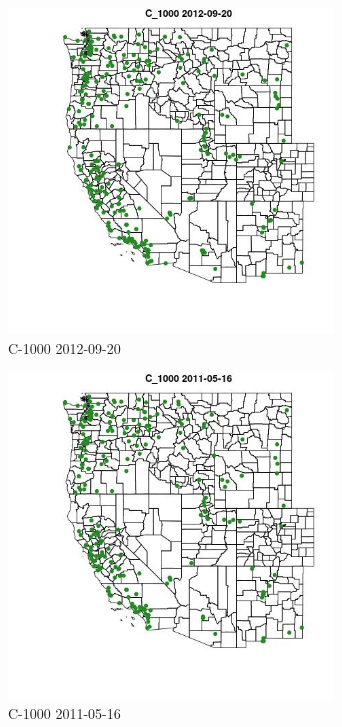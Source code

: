\begin{figure} 
\centering  
\includegraphics[width=0.77\textwidth]{Code_Outputs/ML_input_report_ML_input_PM25_Step5_part_d_de_duplicated_aves_ML_input_MapObsC_10002012-09-20.jpg} 
\caption{\label{fig:ML_input_report_ML_input_PM25_Step5_part_d_de_duplicated_aves_ML_inputMapObsC_10002012-09-20}C-1000 2012-09-20} 
\end{figure} 
 

\begin{figure} 
\centering  
\includegraphics[width=0.77\textwidth]{Code_Outputs/ML_input_report_ML_input_PM25_Step5_part_d_de_duplicated_aves_ML_input_MapObsC_10002011-05-16.jpg} 
\caption{\label{fig:ML_input_report_ML_input_PM25_Step5_part_d_de_duplicated_aves_ML_inputMapObsC_10002011-05-16}C-1000 2011-05-16} 
\end{figure} 
 

